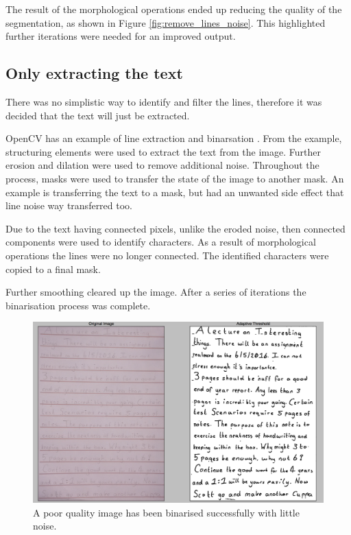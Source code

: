 The result of the morphological operations ended up reducing the quality of the segmentation, as shown in Figure \ref{fig:remove_lines_noise}. This highlighted further iterations were needed for an improved output.

\subsection{Only extracting the text}
There was no simplistic way to identify and filter the lines, therefore it was decided that the text will just be extracted.

OpenCV has an example of line extraction and binarsation \cite{citeulike:14006256}. From the example, structuring elements were used to extract the text from the image. Further erosion and dilation were used to remove additional noise. Throughout the process, masks were used to transfer the state of the image to another mask. An example is transferring the text to a mask, but had an unwanted side effect that line noise way transferred too.

Due to the text having connected pixels, unlike the eroded noise, then connected components were used to identify characters. As a result of  morphological operations the lines were no longer connected. The identified characters were copied to a final mask.

Further smoothing cleared up the image. After a series of iterations the binarisation process was complete.

\begin{figure}[H]
  \centering
  \includegraphics[scale=0.3]{images/hard_image}
  \caption{A poor quality image has been binarised successfully with little noise.}
  \label{fig:poor_quality}
\end{figure}

